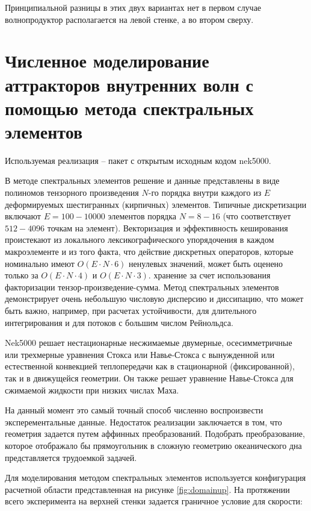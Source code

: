 Принципиальной разницы в этих двух вариантах нет в первом случае волнопродуктор располагается на левой стенке, а во втором сверху.


\section{Численное моделирование аттракторов внутренних волн с помощью метода спектральных элементов}

Используемая реализация -- пакет с открытым исходным кодом nek5000\cite{NEK5000}. 

В методе спектральных элементов решение и данные представлены в виде полиномов тензорного произведения $N$-го порядка внутри каждого из $E$ деформируемых шестигранных (кирпичных) элементов. Типичные дискретизации включают $E = 100 - 10 000$ элементов порядка $N = 8 - 16$ (что соответствует $512 - 4096$ точкам на элемент). Векторизация и эффективность кеширования проистекают из локального лексикографического упорядочения в каждом макроэлементе и из того факта, что действие дискретных операторов, которые номинально имеют $O(E\cdot N \cdot 6)$ ненулевых значений, может быть оценено только за $O(E\cdot N \cdot 4)$ и $O(E\cdot N\cdot 3)$. хранение за счет использования факторизации тензор-произведение-сумма. Метод спектральных элементов демонстрирует очень небольшую числовую дисперсию и диссипацию, что может быть важно, например, при расчетах устойчивости, для длительного интегрирования и для потоков с большим числом Рейнольдса.

Nek5000 решает нестационарные несжимаемые двумерные, осесимметричные или трехмерные уравнения Стокса или Навье-Стокса с вынужденной или естественной конвекцией теплопередачи как в стационарной (фиксированной), так и в движущейся геометрии. Он также решает уравнение Навье-Стокса для сжимаемой жидкости при низких числах Маха.

На данный момент это самый точный способ численно воспроизвести эксперементальные данные\cite{Brouzet2016,Brouzet_2016}. Недостаток реализации заключается в том, что геометрия задается путем аффинных преобразований. Подобрать преобразование, которое отображало бы прямоугольник в сложную геометрию океанического дна представляется трудоемкой задачей. 

Для моделирования методом спектральных элементов используется конфигурация расчетной области представленная на рисунке \ref{fig:domainup}. На протяжении всего эксперимента на верхней стенки задается граничное условие для скорости:

